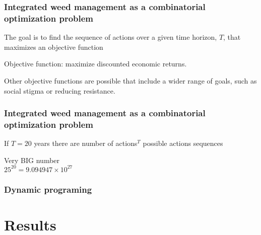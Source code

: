 \documentclass[]{beamer}
\begin{document}
  \begin{frame}
    \frametitle{Integrated weed management as a combinatorial optimization problem}
     The goal is to find the sequence of actions over a given time horizon, $T$, that maximizes an objective function 
     
    Objective function: maximize discounted economic returns.
    
    Other objective functions are possible that include a wider range of goals, such as social stigma or reducing resistance.  
  \end{frame}

  \begin{frame}
    \frametitle{Integrated weed management as a combinatorial optimization problem}
    If $T = 20$ years there are number of actions$^T$ possible actions sequences 
    
    Very BIG number\\
    $25^{20} = 9.094947 \times 10^{27}$ 
  \end{frame}
  
  \begin{frame}
    \frametitle{Dynamic programing}
  \end{frame}

\section{Results}   
  \begin{frame}
    \begin{columns}[c]
  	  \column{2.5in}  %
      \column{2.5in}  %
    \end{columns}
  \end{frame}
  
  \begin{frame}
    \begin{columns}[c]
  	  \column{2.5in}  %
  	  \\~\\
      \column{2.5in}  %
        \\~\\
    \end{columns}
  \end{frame}
  
\end{document}
